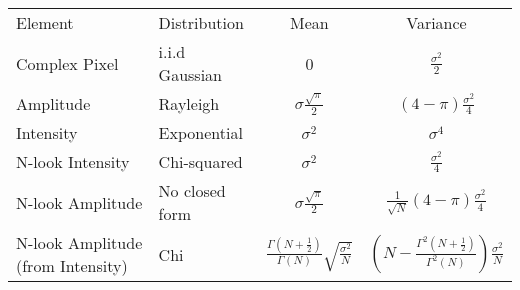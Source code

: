 \documentclass[11pt]{article}
\begin{document}
\begin{table}[b]
	\centering
	\begin{tabular}{llcc}
		\hline
		Element & Distribution &  Mean & Variance\\
		Complex Pixel & i.i.d Gaussian & 0     & $\frac{\sigma^{2}}{2}$\\
		Amplitude & Rayleigh & $\sigma \frac{\sqrt{\pi}}{2}$ & $\left(4 - \pi\right)\frac{\sigma^{2}}{4}$\\
		Intensity & Exponential & $\sigma^{2}$ & $\sigma^{4}$\\
		N-look Intensity & Chi-squared & $\sigma^{2}$ & $\frac{\sigma^{2}}{4}$\\
		N-look Amplitude & No closed form & $\sigma \frac{\sqrt{\pi}}{2}$ & $\frac{1}{\sqrt{N}}\left(4 - \pi\right)\frac{\sigma^{2}}{4}$\\
		N-look Amplitude (from Intensity) & Chi & $\frac{\Gamma\left(N + \frac{1}{2}\right)}{\Gamma\left(N\right)}
		\sqrt{\frac{\sigma^{2}}{N}}$ & 
		$\left(N - \frac{\Gamma^{2}\left(N + \frac{1}{2}\right)}{\Gamma^{2}\left(N\right)}\right)\frac{\sigma^{2}}{N}$
	\end{tabular}
\end{table}
\end{document}
